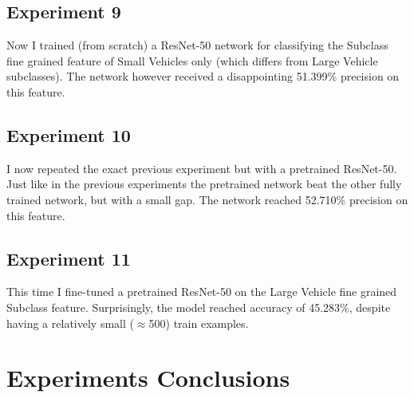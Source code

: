 \documentclass[]{article}
\begin{document}
\subsection{Experiment 9}
Now I trained (from scratch) a ResNet-50 network for classifying the Subclass fine grained feature of Small Vehicles only (which differs from Large Vehicle subclasses).
The network however received a disappointing 51.399\% precision on this feature.

\subsection{Experiment 10}
I now repeated the exact previous experiment but with a pretrained ResNet-50.\\
Just like in the previous experiments the pretrained network beat the other fully trained network, but with a small gap. The network reached 52.710\% precision on this feature.

\subsection{Experiment 11}
This time I fine-tuned a pretrained ResNet-50 on the Large Vehicle fine grained Subclass feature. Surprisingly, the model reached accuracy of 45.283\%, despite having a relatively small ($\approx$500) train examples.

\section{Experiments Conclusions}
\end{document}
